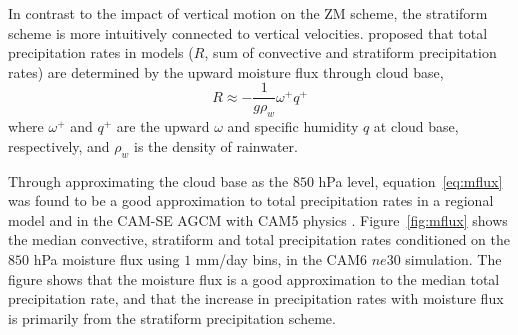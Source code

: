 \documentclass[times]{qjrms4}
\begin{document}
In contrast to the impact of vertical motion on the ZM scheme, the stratiform scheme is more intuitively connected to vertical velocities. \cite{RETAL2016CD} proposed that total precipitation rates in models ($R$, sum of convective and stratiform precipitation rates) are determined by the upward moisture flux through cloud base,
\begin{equation}
R \approx -\frac{1}{g\rho_{w}} \omega^+ q^+ \label{eq:mflux}
\end{equation}
where $\omega^+$ and $q^+$ are the upward $\omega$ and specific humidity $q$ at cloud base, respectively, and $\rho_w$ is the density of rainwater. 

Through approximating the cloud base as the $850$ hPa level, equation~\ref{eq:mflux} was found to be a good approximation to total precipitation rates in a regional model \citep{RETAL2016CD} and in the CAM-SE AGCM with CAM5 physics \citep{OETAL2016JAMES}. Figure~\ref{fig:mflux} shows the median convective, stratiform and total precipitation rates conditioned on the $850$ hPa moisture flux using $1$ mm/day bins, in the CAM6 $ne30$ simulation. The figure shows that the moisture flux is a good approximation to the median total precipitation rate, and that the increase in precipitation rates with moisture flux is primarily from the stratiform precipitation scheme. 
\end{document}

